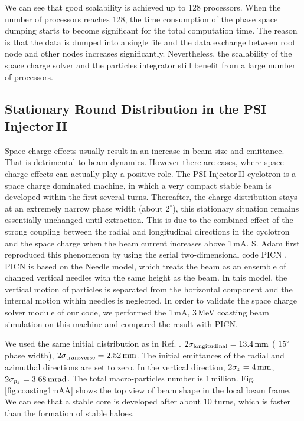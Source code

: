 \documentclass[aps,prstab,twocolumn,superscriptaddress,showpacs]{revtex4}
\begin{document}
We can see that good scalability is achieved up to 128 processors. When the number of processors reaches 128, the time consumption of the phase space dumping starts to become significant for the total computation time.
The reason is that the data is dumped into a single file and the data exchange between root node and other nodes increases significantly.
Nevertheless, the scalability of the space charge solver and the particles integrator still benefit from a large number of processors.

\subsection{Stationary Round Distribution in the PSI Injector\,II}
Space charge effects usually result in an increase in beam size and emittance. That is detrimental to beam dynamics. 
However there are cases, where space charge effects can actually play a positive role. The PSI Injector\,II cyclotron is a space charge dominated machine, in which a very compact 
stable beam is developed within the first several turns. Thereafter, the charge distribution stays at an extremely narrow phase width (about $2^\circ$), this stationary situation
remains essentially unchanged until extraction. This is due to the combined effect of the strong coupling between the
radial and longitudinal directions in the cyclotron and the space charge when the beam current increases above 1\,mA. S. Adam first reproduced this phenomenon by 
using the serial two-dimensional code PICN \cite{Adam:1}. PICN is based on the Needle model, which treats the beam as 
an ensemble of changed vertical needles with the same height as the beam. In this model, the vertical motion of particles is separated from the horizontal 
component and the internal motion within needles is neglected. In order to validate the space charge solver module of our code, we performed the 1\,mA, 3\,MeV coasting beam simulation on this machine and compared the result with PICN.  

We used the same initial distribution as in Ref. .
$2\sigma_{\RM{longitudinal}} = 13.4 {\RM{\,mm}}$ ( $15^\circ$ phase width), $2\sigma_{\RM{transverse}} = 2.52 {\RM{\,mm}}$. 
The initial emittances of the radial and azimuthal directions are set to zero. 
In the vertical direction, $2\sigma_z = 4{\RM{\,mm}}$, $2\sigma_{p_z} = 3.68{\RM{\,mrad}}$. 
The total macro-particles number is 1\,million.  Fig.\,\ref{fig:coasting1mAA} shows the top view of beam shape in the local beam frame.
We can see that a stable core is developed after about 10 turns, which is faster than the formation of stable haloes.
\end{document}
